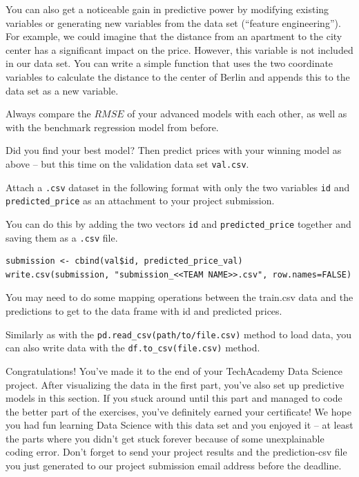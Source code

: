 \documentclass[
  11pt,
]{article}
\newenvironment{tips}[1]
  {
  \begin{itemize}
  \footnotesize
  \renewcommand{\labelitemi}{
    \raisebox{-.7\height}[0pt][0pt]{
      {\setkeys{Gin}{width=3em,keepaspectratio}
        \texttt{[image: images/\#1.png]}}
    }
  }
  \setlength{\fboxsep}{1em}
  \begin{rbox}
  \item
  }
  {
  \end{rbox}
  \end{itemize}
  }
\newenvironment{tipsp}[1]
  {
  \begin{itemize}
  \footnotesize
  \renewcommand{\labelitemi}{
    \raisebox{-.7\height}[0pt][0pt]{
      {\setkeys{Gin}{width=3em,keepaspectratio}
        \texttt{[image: images/\#1.png]}}
    }
  }
  \setlength{\fboxsep}{1em}
  \begin{pbox}
  \item
  }
  {
  \end{pbox}
  \end{itemize}
  }
\begin{document}
You can also get a noticeable gain in predictive power by modifying existing variables or generating new variables from the data set (``feature engineering''). For example, we could imagine that the distance from an apartment to the city center has a significant impact on the price. However, this variable is not
included in our data set. You can write a simple function that uses the two coordinate variables to calculate the distance to the center of Berlin and appends this to the data set as a new variable.

Always compare the \(RMSE\) of your advanced models with each other, as well as with the benchmark regression model from before.

Did you find your best model? Then predict prices with your winning model as above -- but this time on the validation data set \texttt{val.csv}.

Attach a \texttt{.csv} dataset in the following format with only the two variables \texttt{id} and \texttt{predicted\_price} as an attachment to your project submission.

\begin{tips}r

You can do this by adding the two vectors \texttt{id} and \texttt{predicted\_price} together and saving them as a \texttt{.csv} file.

\begin{verbatim}
submission <- cbind(val$id, predicted_price_val)
write.csv(submission, "submission_<<TEAM NAME>>.csv", row.names=FALSE)
\end{verbatim}

\end{tips}

\begin{tipsp}p
You may need to do some mapping operations between the train.csv data and the predictions to get to the data frame with id and predicted prices.

Similarly as with the \texttt{pd.read\_csv(path/to/file.csv)} method to load data, you can also write data with the \texttt{df.to\_csv(file.csv)} method.

\end{tipsp}

Congratulations! You've made it to the end of your TechAcademy Data Science project. After visualizing the data in the first part, you've also set up predictive models in this section. If you stuck around until this part and managed to code the better part of the exercises, you've definitely earned your certificate! We hope you had fun learning Data Science with this data set and you enjoyed it -- at least the parts where you didn't get stuck forever because of some unexplainable coding error. Don't forget to send your project results and the prediction-csv file you just generated to our project submission email address before the deadline.
\end{document}

